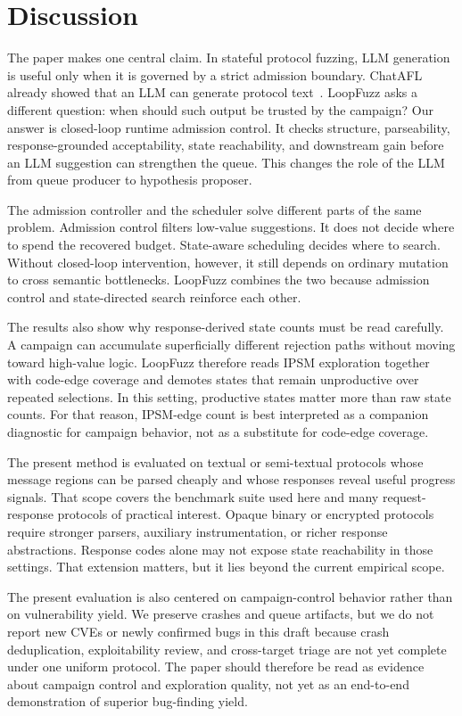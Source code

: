 \documentclass[conference]{IEEEtran}
\begin{document}
\section{Discussion}

The paper makes one central claim. In stateful protocol fuzzing, LLM generation is useful only when it is governed by a strict admission boundary. ChatAFL already showed that an LLM can generate protocol text~\cite{chatafl}. LoopFuzz asks a different question: when should such output be trusted by the campaign? Our answer is closed-loop runtime admission control. It checks structure, parseability, response-grounded acceptability, state reachability, and downstream gain before an LLM suggestion can strengthen the queue. This changes the role of the LLM from queue producer to hypothesis proposer.

The admission controller and the scheduler solve different parts of the same problem. Admission control filters low-value suggestions. It does not decide where to spend the recovered budget. State-aware scheduling decides where to search. Without closed-loop intervention, however, it still depends on ordinary mutation to cross semantic bottlenecks. LoopFuzz combines the two because admission control and state-directed search reinforce each other.

The results also show why response-derived state counts must be read carefully. A campaign can accumulate superficially different rejection paths without moving toward high-value logic. LoopFuzz therefore reads IPSM exploration together with code-edge coverage and demotes states that remain unproductive over repeated selections. In this setting, productive states matter more than raw state counts. For that reason, IPSM-edge count is best interpreted as a companion diagnostic for campaign behavior, not as a substitute for code-edge coverage.

The present method is evaluated on textual or semi-textual protocols whose message regions can be parsed cheaply and whose responses reveal useful progress signals. That scope covers the benchmark suite used here and many request-response protocols of practical interest. Opaque binary or encrypted protocols require stronger parsers, auxiliary instrumentation, or richer response abstractions. Response codes alone may not expose state reachability in those settings. That extension matters, but it lies beyond the current empirical scope.

The present evaluation is also centered on campaign-control behavior rather than on vulnerability yield. We preserve crashes and queue artifacts, but we do not report new CVEs or newly confirmed bugs in this draft because crash deduplication, exploitability review, and cross-target triage are not yet complete under one uniform protocol. The paper should therefore be read as evidence about campaign control and exploration quality, not yet as an end-to-end demonstration of superior bug-finding yield.
\end{document}
